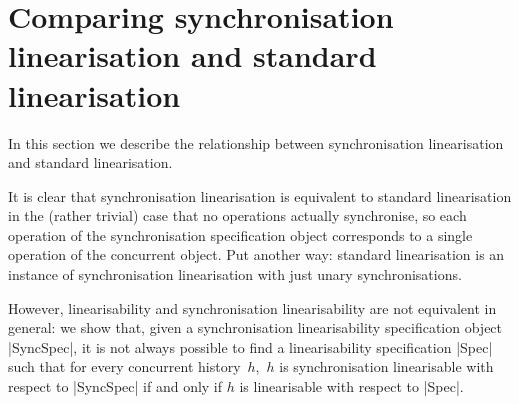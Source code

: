 \section{Comparing synchronisation linearisation and standard linearisation}
\label{sec:relating}

In this section we describe the relationship between synchronisation
linearisation and standard linearisation.

It is clear that synchronisation linearisation is equivalent to standard
linearisation in the (rather trivial) case that no operations actually
synchronise, so each operation of the synchronisation specification object
corresponds to a single operation of the concurrent object.  Put another way:
standard linearisation is an instance of synchronisation linearisation with
just unary synchronisations.


However, linearisability and synchronisation linearisability are not
equivalent in general: we show that, given a synchronisation linearisability
specification object |SyncSpec|, it is not always possible to find a
linearisability specification |Spec| such that for every concurrent
history~$h$,\, $h$ is synchronisation linearisable with respect to |SyncSpec|
if and only if $h$ is linearisable with respect to |Spec|.

